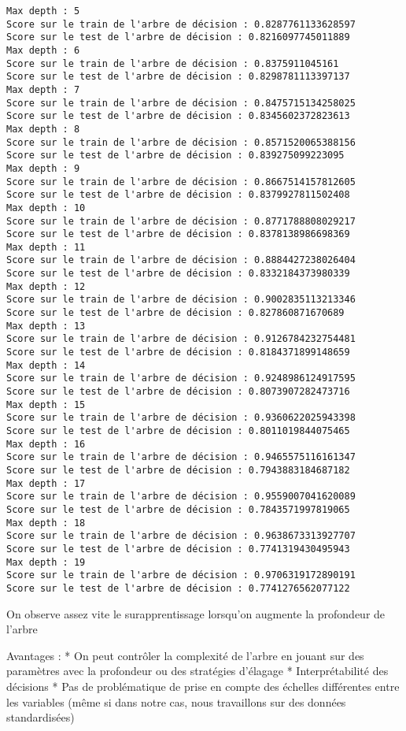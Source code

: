 \documentclass[11pt]{article}
\begin{document}
    \begin{Verbatim}[commandchars=\\\{\}]
Max depth : 5
Score sur le train de l'arbre de décision : 0.8287761133628597
Score sur le test de l'arbre de décision : 0.8216097745011889
Max depth : 6
Score sur le train de l'arbre de décision : 0.8375911045161
Score sur le test de l'arbre de décision : 0.8298781113397137
Max depth : 7
Score sur le train de l'arbre de décision : 0.8475715134258025
Score sur le test de l'arbre de décision : 0.8345602372823613
Max depth : 8
Score sur le train de l'arbre de décision : 0.8571520065388156
Score sur le test de l'arbre de décision : 0.839275099223095
Max depth : 9
Score sur le train de l'arbre de décision : 0.8667514157812605
Score sur le test de l'arbre de décision : 0.8379927811502408
Max depth : 10
Score sur le train de l'arbre de décision : 0.8771788808029217
Score sur le test de l'arbre de décision : 0.8378138986698369
Max depth : 11
Score sur le train de l'arbre de décision : 0.8884427238026404
Score sur le test de l'arbre de décision : 0.8332184373980339
Max depth : 12
Score sur le train de l'arbre de décision : 0.9002835113213346
Score sur le test de l'arbre de décision : 0.827860871670689
Max depth : 13
Score sur le train de l'arbre de décision : 0.9126784232754481
Score sur le test de l'arbre de décision : 0.8184371899148659
Max depth : 14
Score sur le train de l'arbre de décision : 0.9248986124917595
Score sur le test de l'arbre de décision : 0.8073907282473716
Max depth : 15
Score sur le train de l'arbre de décision : 0.9360622025943398
Score sur le test de l'arbre de décision : 0.8011019844075465
Max depth : 16
Score sur le train de l'arbre de décision : 0.9465575116161347
Score sur le test de l'arbre de décision : 0.7943883184687182
Max depth : 17
Score sur le train de l'arbre de décision : 0.9559007041620089
Score sur le test de l'arbre de décision : 0.7843571997819065
Max depth : 18
Score sur le train de l'arbre de décision : 0.9638673313927707
Score sur le test de l'arbre de décision : 0.7741319430495943
Max depth : 19
Score sur le train de l'arbre de décision : 0.9706319172890191
Score sur le test de l'arbre de décision : 0.7741276562077122
    \end{Verbatim}

    On observe assez vite le surapprentissage lorsqu'on augmente la
profondeur de l'arbre

Avantages : * On peut contrôler la complexité de l'arbre en jouant sur
des paramètres avec la profondeur ou des stratégies d'élagage *
Interprétabilité des décisions * Pas de problématique de prise en compte
des échelles différentes entre les variables (même si dans notre cas,
nous travaillons sur des données standardisées)
\end{document}
